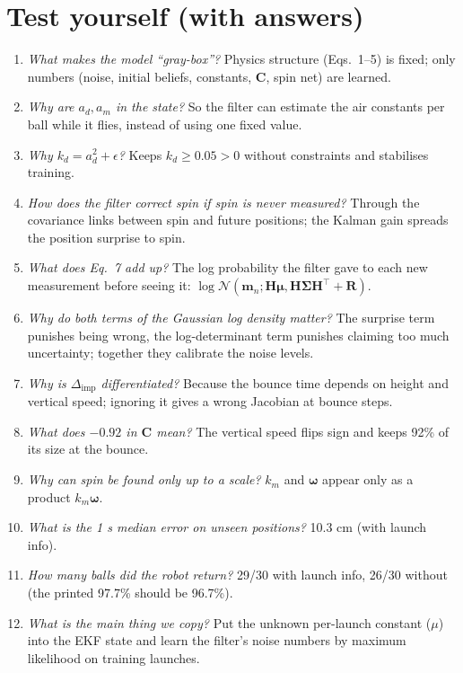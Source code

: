 \documentclass[11pt,a4paper]{article}
\newcommand{\mm}{\mathbf{m}}
\newcommand{\ww}{\boldsymbol{\omega}}
\newcommand{\mmu}{\boldsymbol{\mu}}
\newcommand{\SSigma}{\boldsymbol{\Sigma}}
\begin{document}
\section{Test yourself (with answers)}
\begin{enumerate}
\item \emph{What makes the model ``gray-box''?} Physics structure (Eqs.~1--5) is fixed; only numbers (noise, initial beliefs, constants, $\mathbf C$, spin net) are learned.
\item \emph{Why are $a_d,a_m$ in the state?} So the filter can estimate the air constants per ball while it flies, instead of using one fixed value.
\item \emph{Why $k_d=a_d^2+\epsilon$?} Keeps $k_d\geq0.05>0$ without constraints and stabilises training.
\item \emph{How does the filter correct spin if spin is never measured?} Through the covariance links between spin and future positions; the Kalman gain spreads the position surprise to spin.
\item \emph{What does Eq.~7 add up?} The log probability the filter gave to each new measurement before seeing it: $\log\mathcal N(\mm_n;\mathbf H\mmu,\mathbf H\SSigma\mathbf H^\top+\mathbf R)$.
\item \emph{Why do both terms of the Gaussian log density matter?} The surprise term punishes being wrong, the log-determinant term punishes claiming too much uncertainty; together they calibrate the noise levels.
\item \emph{Why is $\Delta_{\text{imp}}$ differentiated?} Because the bounce time depends on height and vertical speed; ignoring it gives a wrong Jacobian at bounce steps.
\item \emph{What does $-0.92$ in $\mathbf C$ mean?} The vertical speed flips sign and keeps 92\% of its size at the bounce.
\item \emph{Why can spin be found only up to a scale?} $k_m$ and $\ww$ appear only as a product $k_m\ww$.
\item \emph{What is the 1 s median error on unseen positions?} 10.3 cm (with launch info).
\item \emph{How many balls did the robot return?} 29/30 with launch info, 26/30 without (the printed 97.7\% should be 96.7\%).
\item \emph{What is the main thing we copy?} Put the unknown per-launch constant ($\mu$) into the EKF state and learn the filter's noise numbers by maximum likelihood on training launches.
\end{enumerate}
\end{document}
